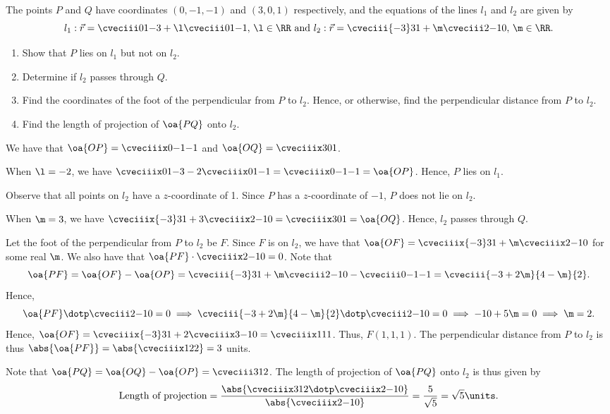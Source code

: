 \clearpage
\begin{problem}
    The points $P$ and $Q$ have coordinates $(0, -1, -1)$ and $(3, 0, 1)$ respectively, and the equations of the lines $l_1$ and $l_2$ are given by \[l_1 : \vec r = \cveciii01{-3} + \l\cveciii01{-1}, \, \l \in \RR \text{ and } l_2 : \vec r = \cveciii{-3}31 + \m \cveciii2{-1}0, \, \m \in \RR.\]

    \begin{enumerate}
        \item Show that $P$ lies on $l_1$ but not on $l_2$.
        \item Determine if $l_2$ passes through $Q$.
        \item Find the coordinates of the foot of the perpendicular from $P$ to $l_2$. Hence, or otherwise, find the perpendicular distance from $P$ to $l_2$.
        \item Find the length of projection of $\oa{PQ}$ onto $l_2$.
    \end{enumerate}
\end{problem}
\begin{solution}
    We have that $\oa{OP} = \cveciiix0{-1}{-1}$ and $\oa{OQ} = \cveciiix301$.

    \begin{ppart}
        When $\l = -2$, we have $\cveciiix01{-3} - 2\cveciiix01{-1} = \cveciiix0{-1}{-1} = \oa{OP}$. Hence, $P$ lies on $l_1$.

        Observe that all points on $l_2$ have a $z$-coordinate of 1. Since $P$ has a $z$-coordinate of $-1$, $P$ does not lie on $l_2$.
    \end{ppart}
    \begin{ppart}
        When $\m = 3$, we have $\cveciiix{-3}31 + 3\cveciiix2{-1}0 = \cveciiix301 = \oa{OQ}$. Hence, $l_2$ passes through $Q$.
    \end{ppart}
    \begin{ppart}
        Let the foot of the perpendicular from $P$ to $l_2$ be $F$. Since $F$ is on $l_2$, we have that $\oa{OF} = \cveciiix{-3}31 + \m\cveciiix2{-1}0$ for some real $\m$. We also have that $\oa{PF} \cdot \cveciiix2{-1}0 = 0$. Note that \[\oa{PF} = \oa{OF} - \oa{OP} = \cveciii{-3}31 + \m\cveciii2{-1}0 - \cveciii0{-1}{-1} = \cveciii{-3 + 2\m}{4-\m}{2}.\] Hence, \[\oa{PF} \dotp \cveciii2{-1}0 = 0 \implies \cveciii{-3 + 2\m}{4-\m}{2} \dotp \cveciii2{-1}0 = 0 \implies -10 + 5\m = 0 \implies \m = 2.\] Hence, $\oa{OF} = \cveciiix{-3}31 + 2\cveciiix3{-1}0 = \cveciiix111$. Thus, $F(1, 1, 1)$. The perpendicular distance from $P$ to $l_2$ is thus $\abs{\oa{PF}} = \abs{\cveciiix122} = 3$ units.
    \end{ppart}
    \begin{ppart}
        Note that $\oa{PQ} = \oa{OQ} - \oa{OP} = \cveciii312$. The length of projection of $\oa{PQ}$ onto $l_2$ is thus given by \[\text{Length of projection} = \frac{\abs{\cveciiix312 \dotp \cveciiix2{-1}0}}{\abs{\cveciiix2{-1}0}} = \frac5{\sqrt 5} = \sqrt{5} \units.\]
    \end{ppart}
\end{solution}

